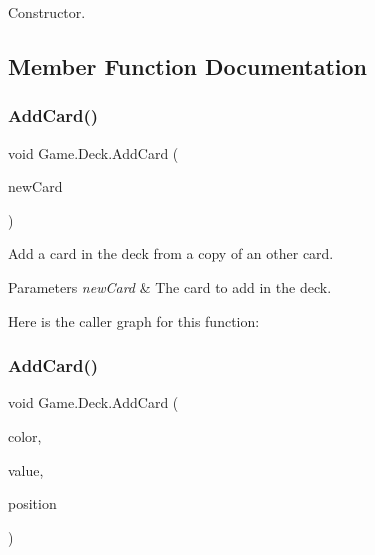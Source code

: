 Constructor. 

\subsection{Member Function Documentation}
\mbox{\label{class_game_1_1_deck_a905f11ad54ca87390a643a9b78e90e3b}} 
\subsubsection{\texorpdfstring{Add\+Card()}{AddCard()}\hspace{0.1cm}{\footnotesize\ttfamily [1/2]}}
{\footnotesize\ttfamily void Game.\+Deck.\+Add\+Card (\begin{DoxyParamCaption}\item[{\hyperlink{class_game_1_1_card}{Card}}]{new\+Card }\end{DoxyParamCaption})\hspace{0.3cm}{\ttfamily [inline]}}

Add a card in the deck from a copy of an other card. 
\begin{DoxyParams}{Parameters}
{\em new\+Card} & The card to add in the deck. \\
\hline
\end{DoxyParams}
Here is the caller graph for this function\+:
\mbox{\label{class_game_1_1_deck_a0e9186cc809c646aa1ef5ad38f684b91}} 
\subsubsection{\texorpdfstring{Add\+Card()}{AddCard()}\hspace{0.1cm}{\footnotesize\ttfamily [2/2]}}
{\footnotesize\ttfamily void Game.\+Deck.\+Add\+Card (\begin{DoxyParamCaption}\item[{Card\+Colour}]{color,  }\item[{Card\+Value}]{value,  }\item[{Card\+Position}]{position }\end{DoxyParamCaption})\hspace{0.3cm}{\ttfamily [inline]}}


